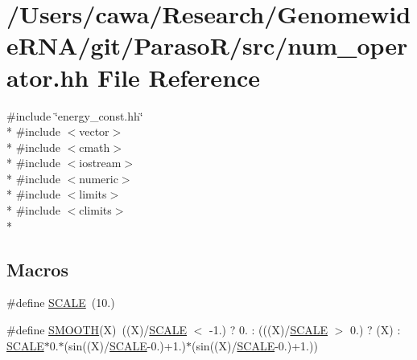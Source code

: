 \hypertarget{num__operator_8hh}{\section{/\+Users/cawa/\+Research/\+Genomewide\+R\+N\+A/git/\+Paraso\+R/src/num\+\_\+operator.hh File Reference}
\label{num__operator_8hh}
}
{\ttfamily \#include \char`\"{}energy\+\_\+const.\+hh\char`\"{}}\\*
{\ttfamily \#include $<$vector$>$}\\*
{\ttfamily \#include $<$cmath$>$}\\*
{\ttfamily \#include $<$iostream$>$}\\*
{\ttfamily \#include $<$numeric$>$}\\*
{\ttfamily \#include $<$limits$>$}\\*
{\ttfamily \#include $<$climits$>$}\\*
\subsection*{Macros}
\begin{DoxyCompactItemize}
\item 
\#define \hyperlink{num__operator_8hh_a0cbea62f1ce2043dd08108e65ed8de1d}{S\+C\+A\+L\+E}~(10.)
\item 
\#define \hyperlink{num__operator_8hh_a0e75be7c3935c7c6d0b1dfba05fe37a6}{S\+M\+O\+O\+T\+H}(X)~((X)/\hyperlink{num__operator_8hh_a0cbea62f1ce2043dd08108e65ed8de1d}{S\+C\+A\+L\+E} $<$ -\/1.) ? 0. \+: (((X)/\hyperlink{num__operator_8hh_a0cbea62f1ce2043dd08108e65ed8de1d}{S\+C\+A\+L\+E} $>$ 0.) ? (X) \+: \hyperlink{num__operator_8hh_a0cbea62f1ce2043dd08108e65ed8de1d}{S\+C\+A\+L\+E}$\ast$0.$\ast$(sin((X)/\hyperlink{num__operator_8hh_a0cbea62f1ce2043dd08108e65ed8de1d}{S\+C\+A\+L\+E}-\/0.)+1.)$\ast$(sin((X)/\hyperlink{num__operator_8hh_a0cbea62f1ce2043dd08108e65ed8de1d}{S\+C\+A\+L\+E}-\/0.)+1.))
\end{DoxyCompactItemize}
